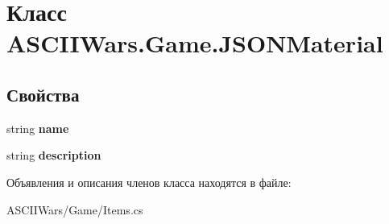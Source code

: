 \hypertarget{class_a_s_c_i_i_wars_1_1_game_1_1_j_s_o_n_material}{}\section{Класс A\+S\+C\+I\+I\+Wars.\+Game.\+J\+S\+O\+N\+Material}
\label{class_a_s_c_i_i_wars_1_1_game_1_1_j_s_o_n_material}
\subsection*{Свойства}
\begin{DoxyCompactItemize}
\item 
\hypertarget{class_a_s_c_i_i_wars_1_1_game_1_1_j_s_o_n_material_a9df052f6f8c7941082da4ccd44d29455}{}\label{class_a_s_c_i_i_wars_1_1_game_1_1_j_s_o_n_material_a9df052f6f8c7941082da4ccd44d29455} 
string {\bfseries name}
\item 
\hypertarget{class_a_s_c_i_i_wars_1_1_game_1_1_j_s_o_n_material_a099d5775950c583e3c660d69348590f2}{}\label{class_a_s_c_i_i_wars_1_1_game_1_1_j_s_o_n_material_a099d5775950c583e3c660d69348590f2} 
string {\bfseries description}
\end{DoxyCompactItemize}


Объявления и описания членов класса находятся в файле\+:\begin{DoxyCompactItemize}
\item 
A\+S\+C\+I\+I\+Wars/\+Game/Items.\+cs\end{DoxyCompactItemize}
